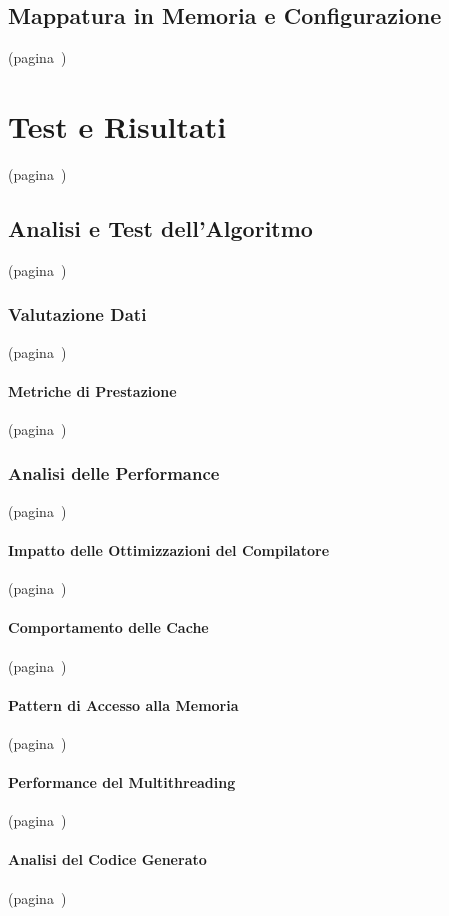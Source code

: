\section{Mappatura in Memoria e Configurazione}(pagina~\pageref{sec:gvsoc_int})

\chapter{Test e Risultati} (pagina~\pageref{chap:test})
\section{Analisi e Test dell'Algoritmo}(pagina~\pageref{sec:alg_anal})
\subsection{Valutazione Dati}(pagina~\pageref{sec:bench})
\subsubsection{Metriche di Prestazione}(pagina~\pageref{sec:Data_Perf})
\subsection{Analisi delle Performance}(pagina~\pageref{sec:data_anal})
\subsubsection{Impatto delle Ottimizzazioni del Compilatore}(pagina~\pageref{sec:compiler_impact})
\subsubsection{Comportamento delle Cache}(pagina~\pageref{sec:cache_beh})
\subsubsection{Pattern di Accesso alla Memoria}(pagina~\pageref{sec:mem_access})
\subsubsection{Performance del Multithreading}(pagina~\pageref{sec:multi_perf})
\subsubsection{Analisi del Codice Generato}(pagina~\pageref{sec:codegen_analysis})
